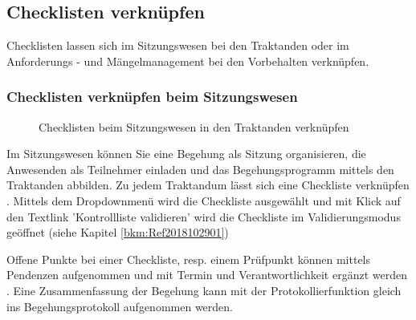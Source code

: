 \subsection{Checklisten verknüpfen}

Checklisten lassen sich im Sitzungswesen bei den Traktanden oder im Anforderungs - und Mängelmanagement bei den Vorbehalten verknüpfen.

\vspace{\baselineskip}

\subsubsection{Checklisten verknüpfen beim Sitzungswesen}

\begin{figure}[H]
\caption{Checklisten beim Sitzungswesen in den Traktanden verknüpfen}
\end{figure}

Im Sitzungswesen können Sie eine Begehung als Sitzung organisieren, die Anwesenden als Teilnehmer einladen und das Begehungsprogramm mittels den Traktanden abbilden. Zu jedem Traktandum lässt sich eine Checkliste verknüpfen . Mittels dem Dropdownmenü  wird die Checkliste ausgewählt und mit Klick auf den Textlink 'Kontrollliste validieren' wird die Checkliste im Validierungsmodus geöffnet (siehe Kapitel \ref{bkm:Ref2018102901})

\vspace{\baselineskip}

Offene Punkte bei einer Checkliste, resp. einem Prüfpunkt können mittels Pendenzen aufgenommen und mit Termin und Verantwortlichkeit ergänzt werden . Eine Zusammenfassung der Begehung kann mit der Protokollierfunktion gleich ins Begehungsprotokoll aufgenommen werden.


